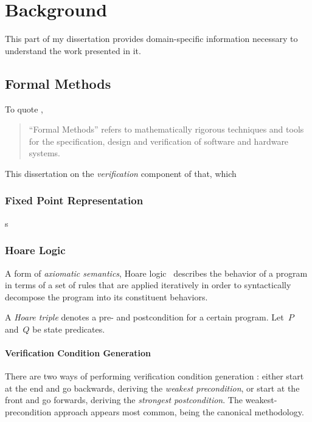 \chapter{Background}\label{ch:background}
This part of my dissertation provides domain-specific information necessary to understand
the work presented in it.

\section{Formal Methods}
To quote \citet{butler:fm},
\begin{quote}
  ``Formal Methods''%
  refers to mathematically rigorous techniques and tools
  for the specification, design and verification of software and hardware systems.
\end{quote}
This dissertation on the \emph{verification} component of that,%
which 

\subsection{Fixed Point Representation}
s

\subsection{Hoare Logic}\label{se:hoare}
A form of \emph{axiomatic semantics},
Hoare logic~\citep{hoare1969axiomatic,myreen2007hoare}%
describes the behavior of a program
in terms of a set of rules that are applied iteratively
in order to syntactically decompose the program into its constituent behaviors.

A \emph{Hoare triple} denotes a pre- and postcondition for a certain program.%
%
%
Let~$P$ and~$Q$ be state predicates.


\subsubsection{Verification Condition Generation}

There are two ways of performing verification condition generation%
:
either start at the end and go backwards, deriving the \emph{weakest precondition},%
or start at the front and go forwards, deriving the \emph{strongest postcondition}.%
The weakest-precondition approach appears most common,
being the canonical methodology.

